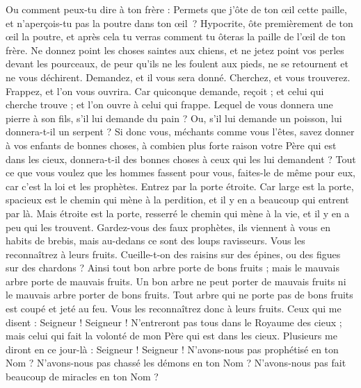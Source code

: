\begin{multicols}{2}
Ou comment peux-tu dire à ton frère : Permets que j'ôte de ton œil cette paille, et n’aperçois-tu pas la poutre dans ton œil ?
Hypocrite, ôte premièrement de ton œil la poutre, et après cela tu verras comment tu ôteras la paille de l’œil de ton frère.
Ne donnez point les choses saintes aux chiens, et ne jetez point vos perles devant les pourceaux, de peur qu'ils ne les foulent aux pieds, ne se retournent et ne vous déchirent.
Demandez, et il vous sera donné. Cherchez, et vous trouverez. Frappez, et l’on vous ouvrira.
Car quiconque demande, reçoit ; et celui qui cherche trouve ; et l’on ouvre à celui qui frappe.
Lequel de vous donnera une pierre à son fils, s'il lui demande du pain ?
Ou, s’il lui demande un poisson, lui donnera-t-il un serpent ?
Si donc vous, méchants comme vous l’êtes, savez donner à vos enfants de bonnes choses, à combien plus forte raison votre Père qui est dans les cieux, donnera-t-il des bonnes choses à ceux qui les lui demandent ?
Tout ce que vous voulez que les hommes fassent pour vous, faites-le de même pour eux, car c’est la loi et les prophètes.
Entrez par la porte étroite. Car large est la porte, spacieux est le chemin qui mène à la perdition, et il y en a beaucoup qui entrent par là.
Mais étroite est la porte, resserré le chemin qui mène à la vie, et il y en a peu qui les trouvent.
Gardez-vous des faux prophètes, ils viennent à vous en habits de brebis, mais au-dedans ce sont des loups ravisseurs.
Vous les reconnaîtrez à leurs fruits. Cueille-t-on des raisins sur des épines, ou des figues sur des chardons ?
Ainsi tout bon arbre porte de bons fruits ; mais le mauvais arbre porte de mauvais fruits.
Un bon arbre ne peut porter de mauvais fruits ni le mauvais arbre porter de bons fruits.
Tout arbre qui ne porte pas de bons fruits est coupé et jeté au feu.
Vous les reconnaîtrez donc à leurs fruits.
Ceux qui me disent : Seigneur ! Seigneur ! N’entreront pas tous dans le Royaume des cieux ; mais celui qui fait la volonté de mon Père qui est dans les cieux.
Plusieurs me diront en ce jour-là : Seigneur ! Seigneur ! N’avons-nous pas prophétisé en ton Nom ? N'avons-nous pas chassé les démons en ton Nom ? N'avons-nous pas fait beaucoup de miracles en ton Nom ?

\end{multicols}
